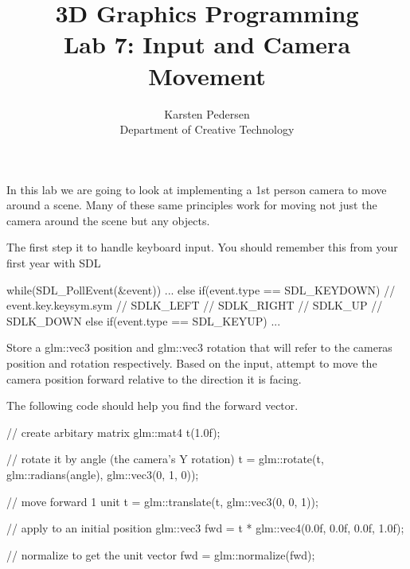 \documentclass[10pt]{article}
\begin{document}
\title{3D Graphics Programming \\
  \large Lab 7: Input and Camera Movement}

\author{Karsten Pedersen\\ Department of Creative Technology}
\maketitle

In this lab we are going to look at implementing a 1st person camera to
move around a scene. Many of these same principles work for moving not
just the camera around the scene but any objects.

The first step it to handle keyboard input. You should remember this
from your first year with SDL

\begin{Code}

while(SDL_PollEvent(&event))
{
  ...
  else if(event.type == SDL_KEYDOWN)
  {
    // event.key.keysym.sym
    // SDLK_LEFT
    // SDLK_RIGHT
    // SDLK_UP
    // SDLK_DOWN
  }
  else if(event.type == SDL_KEYUP)
  {
    ...
  }
}

\end{Code}

Store a glm::vec3 position and glm::vec3 rotation that will refer to
the cameras position and rotation respectively.  Based on the input,
attempt to move the camera position forward relative to the direction
it is facing.


The following code should help you find the forward vector.

\begin{Code}

// create arbitary matrix
glm::mat4 t(1.0f);

// rotate it by angle (the camera's Y rotation)
t = glm::rotate(t, glm::radians(angle), glm::vec3(0, 1, 0));

// move forward 1 unit
t = glm::translate(t, glm::vec3(0, 0, 1));

// apply to an initial position
glm::vec3 fwd = t * glm::vec4(0.0f, 0.0f, 0.0f, 1.0f);

// normalize to get the unit vector
fwd = glm::normalize(fwd);

\end{Code}
\end{document}
